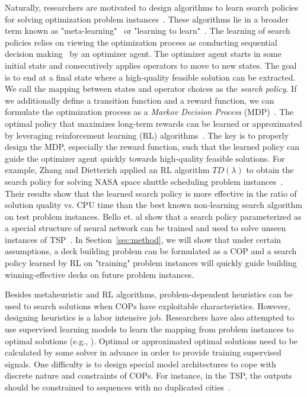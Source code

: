 Naturally, researchers are motivated to design algorithms to learn search policies for solving optimization problem instances~\cite{zoph2016neural,li2017learning,chenlearning,zhang2000solving}. These algorithms lie in a broader term known as "meta-learning"~\cite{lemke2015metalearning,brazdil2008metalearning,vilalta2002perspective} or "learning to learn"~\cite{thrun2012learning}. The learning of search policies relies on viewing the optimization process as conducting sequential decision making~\cite{littman1996algorithms} by an optimizer agent. The optimizer agent starts in some initial state and consecutively applies operators to move to new states. The goal is to end at a final state where a high-quality feasible solution can be extracted. We call the mapping between states and operator choices as the \textit{search policy}. If we additionally define a transition function and a reward function, we can formulate the optimization process as a \textit{Markov Decision Process} (MDP)~\cite{bellman1957markovian}. The optimal policy that maximizes long-term rewards can be learned or approximated by leveraging reinforcement learning (RL) algorithms~\cite{sutton1998reinforcement}. The key is to properly design the MDP, especially the reward function, such that the learned policy can guide the optimizer agent quickly towards high-quality feasible solutions. For example, Zhang and Dietterich applied an RL algorithm $TD(\lambda)$ to obtain the search policy for solving NASA space shuttle scheduling problem instances~\cite{zhang2000solving}. Their results show that the learned search policy is more effective in the ratio of solution quality vs. CPU time than the best known non-learning search algorithm on test problem instances. Bello et. al show that a search policy parameterized as a special structure of neural network can be trained and used to solve unseen instances of TSP~\cite{zoph2016neural}. In Section~\ref{sec:method}, we will show that under certain assumptions, a deck building problem can be formulated as a COP and a search policy learned by RL  on "training" problem instances will quickly guide building winning-effective decks on future problem instances. 

Besides metaheuristic and RL algorithms, problem-dependent heuristics can be used to search solutions when COPs have exploitable characteristics. However, designing heuristics is a labor intensive job. Researchers have also attempted to use supervised learning models to learn the mapping from problem instances to optimal solutions (e.g., \cite{vinyals2015pointer}). Optimal or approximated optimal solutions need to be calculated by some solver in advance in order to provide training supervised signals. One difficulty is to design special model architectures to cope with discrete nature and constraints of COPs. For instance, in the TSP, the outputs should be constrained to sequences with no duplicated cities~\cite{vinyals2015pointer}. 


